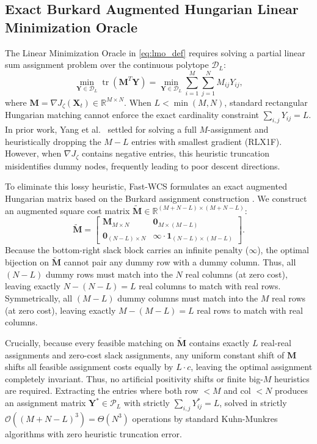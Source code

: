 \documentclass[conference]{IEEEtran}
\begin{document}
\subsection{Exact Burkard Augmented Hungarian Linear Minimization Oracle}
\label{subsec:burkard}

The Linear Minimization Oracle in \eqref{eq:lmo_def} requires solving a partial linear sum assignment problem over the continuous polytope $\mathcal{D}_L$:
\begin{equation}
\min_{\mathbf{Y} \in \mathcal{D}_L} \operatorname{tr}(\mathbf{M}^T \mathbf{Y}) = \min_{\mathbf{Y} \in \mathcal{D}_L} \sum_{i=1}^M \sum_{j=1}^N M_{ij} Y_{ij},
\label{eq:lmo_problem}
\end{equation}
where $\mathbf{M} = \nabla J_\zeta(\mathbf{X}_t) \in \mathbb{R}^{M \times N}$. When $L < \min(M, N)$, standard rectangular Hungarian matching cannot enforce the exact cardinality constraint $\sum_{i, j} Y_{ij} = L$. In prior work, Yang et al.~\cite{yang2018algorithm} settled for solving a full $M$-assignment and heuristically dropping the $M - L$ entries with smallest gradient (RLX1F). However, when $\nabla J_\zeta$ contains negative entries, this heuristic truncation misidentifies dummy nodes, frequently leading to poor descent directions.

To eliminate this lossy heuristic, Fast-WCS formulates an exact augmented Hungarian matrix based on the Burkard assignment construction \cite{loiola2007}. We construct an augmented square cost matrix $\tilde{\mathbf{M}} \in \mathbb{R}^{(M+N-L) \times (M+N-L)}$:
\begin{equation}
\tilde{\mathbf{M}} = \begin{bmatrix}
\mathbf{M}_{M \times N} & \mathbf{0}_{M \times (M - L)} \\
\mathbf{0}_{(N - L) \times N} & \infty \cdot \mathbf{1}_{(N - L) \times (M - L)}
\end{bmatrix}.
\label{eq:augmented_hungarian}
\end{equation}
Because the bottom-right slack block carries an infinite penalty ($\infty$), the optimal bijection on $\tilde{\mathbf{M}}$ cannot pair any dummy row with a dummy column. Thus, all $(N - L)$ dummy rows must match into the $N$ real columns (at zero cost), leaving exactly $N - (N - L) = L$ real columns to match with real rows. Symmetrically, all $(M - L)$ dummy columns must match into the $M$ real rows (at zero cost), leaving exactly $M - (M - L) = L$ real rows to match with real columns.

Crucially, because every feasible matching on $\tilde{\mathbf{M}}$ contains exactly $L$ real-real assignments and zero-cost slack assignments, any uniform constant shift of $\mathbf{M}$ shifts all feasible assignment costs equally by $L \cdot c$, leaving the optimal assignment completely invariant. Thus, no artificial positivity shifts or finite big-$M$ heuristics are required. Extracting the entries where both row $< M$ and col $< N$ produces an assignment matrix $\mathbf{Y}^* \in \mathcal{P}_L$ with strictly $\sum_{i, j} Y^*_{ij} = L$, solved in strictly $\mathcal{O}((M + N - L)^3) = \Theta(N^3)$ operations by standard Kuhn-Munkres algorithms with zero heuristic truncation error.
\end{document}
